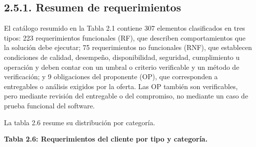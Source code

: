\documentclass[11pt]{article}
\begin{document}
\subsection{2.5.1. Resumen de requerimientos}\label{resumen-de-requerimientos}

El catálogo resumido en la Tabla 2.1 contiene 307 elementos clasificados en tres tipos: 223 requerimientos funcionales (RF), que describen comportamientos que la solución debe ejecutar; 75 requerimientos no funcionales (RNF), que establecen condiciones de calidad, desempeño, disponibilidad, seguridad, cumplimiento u operación y deben contar con un umbral o criterio verificable y un método de verificación; y 9 obligaciones del proponente (OP), que corresponden a entregables o análisis exigidos por la oferta. Las OP también son verificables, pero mediante revisión del entregable o del compromiso, no mediante un caso de prueba funcional del software.

La tabla 2.6 resume su distribución por categoría.

\textbf{Tabla 2.6: Requerimientos del cliente por tipo y categoría.}
\end{document}
